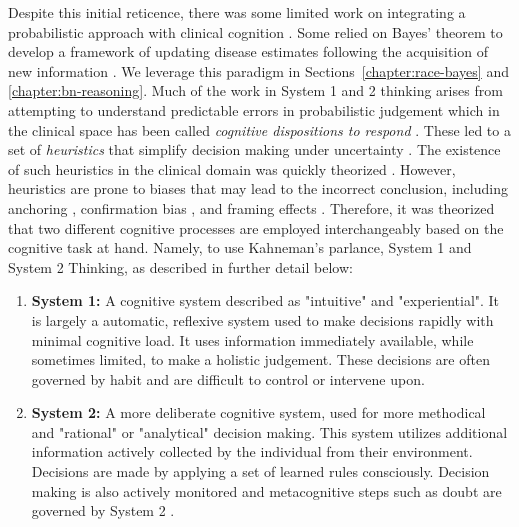 Despite this initial reticence, there was some limited work on integrating a probabilistic approach with clinical cognition \citep{blois1984information}. Some relied on Bayes' theorem to develop a framework of updating disease estimates following the acquisition of new information \citep{huninkDecisionMakingHealth2014, soxMedicalDecisionMaking2013, paukerThresholdApproachClinical1980}. We leverage this paradigm in Sections~\ref{chapter:race-bayes} and \ref{chapter:bn-reasoning}. Much of the work in System 1 and 2 thinking arises from attempting to understand predictable errors in probabilistic judgement \citep{tverskyFramingDecisionsPsychology1981} which in the clinical space has been called \emph{cognitive dispositions to respond} \citep{croskerryImportanceCognitiveErrors2003}. These led to a set of \emph{heuristics} that simplify decision making under uncertainty \citep{tverskyJudgmentUncertaintyHeuristics1974}. The existence of such heuristics in the clinical domain was quickly theorized \citep{eddyProbabilisticReasoningClinical1982}. However, heuristics are prone to biases that may lead to the incorrect conclusion, including anchoring \citep{friedlanderAnchoringPublicityEffects1983}, confirmation bias \citep{klaymanDebiasEnvironmentInstead1993}, and framing effects \citep{mcneilElicitationPreferencesAlternative1982}. Therefore, it was theorized that two different cognitive processes are employed interchangeably based on the cognitive task at hand. Namely, to use Kahneman's parlance, System 1 and System 2 Thinking, as described in further detail below:

\begin{enumerate}
    \item \textbf{System 1:} A cognitive system described as "intuitive" and "experiential". It is largely a automatic, reflexive system used to make decisions rapidly with minimal cognitive load. It uses information immediately available, while sometimes limited, to make a holistic judgement. These decisions are often governed by habit and are difficult to control or intervene upon.
    \item \textbf{System 2:} A more deliberate cognitive system, used for more methodical and "rational" or "analytical" decision making. This system utilizes additional information actively collected by the individual from their environment. Decisions are made by applying a set of learned rules consciously. Decision making is also actively monitored and metacognitive steps such as doubt are governed by System 2 \citep{epsteinIntegrationCognitivePsychodynamic1994, hogarthEducatingIntuition2010,  kahnemanPerspectiveJudgmentChoice2003}.
\end{enumerate}
     


